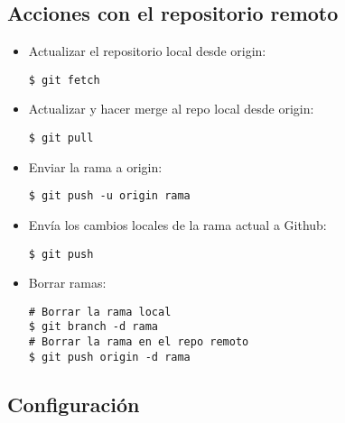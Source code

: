 \subsection{Acciones con el repositorio remoto}

\begin{itemize}[label=-]

\item Actualizar el repositorio local desde origin:
\begin{lstlisting}
$ git fetch
\end{lstlisting}

\item Actualizar y hacer merge al repo local desde origin:
\begin{lstlisting}
$ git pull
\end{lstlisting}

\item Enviar la rama a origin:
\begin{lstlisting}
$ git push -u origin rama
\end{lstlisting}

\item Envía los cambios locales de la rama actual a Github:
\begin{lstlisting}
$ git push
\end{lstlisting}

\item Borrar ramas:
\begin{lstlisting}
# Borrar la rama local
$ git branch -d rama
# Borrar la rama en el repo remoto
$ git push origin -d rama
\end{lstlisting}
\end{itemize}


\subsection{Configuración}

